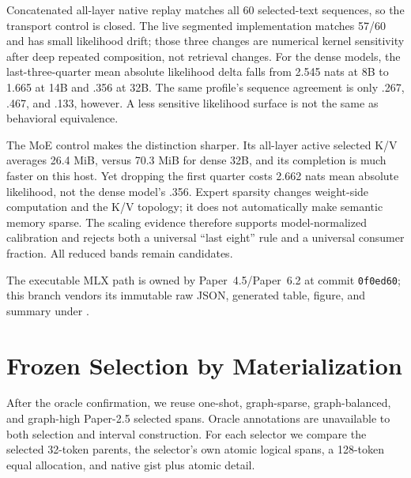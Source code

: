 \documentclass[11pt]{article}
\begin{document}
Concatenated all-layer native replay matches all 60 selected-text sequences,
so the transport control is closed. The live segmented implementation matches
57/60 and has small likelihood drift; those three changes are numerical
kernel sensitivity after deep repeated composition, not retrieval changes.
For the dense models, the last-three-quarter mean absolute likelihood delta
falls from 2.545 nats at 8B to 1.665 at 14B and .356 at 32B. The same profile's
sequence agreement is only .267, .467, and .133, however. A less sensitive
likelihood surface is not the same as behavioral equivalence.

The MoE control makes the distinction sharper. Its all-layer active selected
K/V averages 26.4 MiB, versus 70.3 MiB for dense 32B, and its completion is
much faster on this host. Yet dropping the first quarter costs 2.662 nats mean
absolute likelihood, not the dense model's .356. Expert sparsity changes
weight-side computation and the K/V topology; it does not automatically make
semantic memory sparse. The scaling evidence therefore supports
model-normalized calibration and rejects both a universal ``last eight'' rule
and a universal consumer fraction. All reduced bands remain candidates.

The executable MLX path is owned by Paper~4.5/Paper~6.2 at commit
\texttt{0f0ed60}; this branch vendors its immutable raw JSON, generated table,
figure, and summary under
.

\section{Frozen Selection by Materialization}

After the oracle confirmation, we reuse one-shot, graph-sparse, graph-balanced, and graph-high Paper-2.5 selected
spans.  Oracle annotations are unavailable to both selection and interval construction.  For each
selector we compare the selected 32-token parents, the selector's own atomic logical spans, a
128-token equal allocation, and native gist plus atomic detail.
\end{document}
